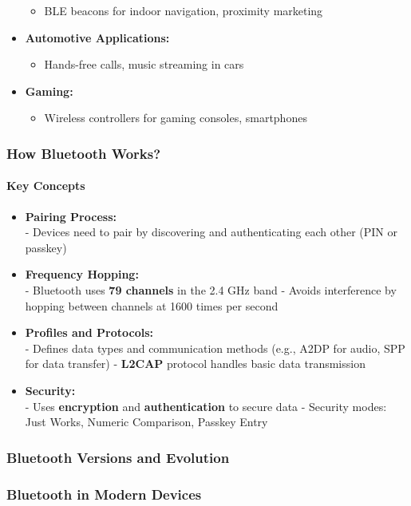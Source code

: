 \begin{itemize}
    \begin{itemize}
        \item BLE beacons for indoor navigation, proximity marketing
    \end{itemize}
    \item \textbf{Automotive Applications:}
    \begin{itemize}
        \item Hands-free calls, music streaming in cars
    \end{itemize}
    \item \textbf{Gaming:}
    \begin{itemize}
        \item Wireless controllers for gaming consoles, smartphones
    \end{itemize}
\end{itemize}
\subsubsection{How Bluetooth Works?}
\paragraph{Key Concepts}
\begin{itemize}
    \item \textbf{Pairing Process:} \\
    - Devices need to pair by discovering and authenticating each other (PIN or passkey)
    \item \textbf{Frequency Hopping:} \\
    - Bluetooth uses \textbf{79 channels} in the 2.4 GHz band
    - Avoids interference by hopping between channels at 1600 times per second
    \item \textbf{Profiles and Protocols:} \\
    - Defines data types and communication methods (e.g., A2DP for audio, SPP for data transfer)
    - \textbf{L2CAP} protocol handles basic data transmission
    \item \textbf{Security:} \\
    - Uses \textbf{encryption} and \textbf{authentication} to secure data
    - Security modes: Just Works, Numeric Comparison, Passkey Entry
\end{itemize}
\subsubsection{Bluetooth Versions and Evolution}
\subsubsection{Bluetooth in Modern Devices}
